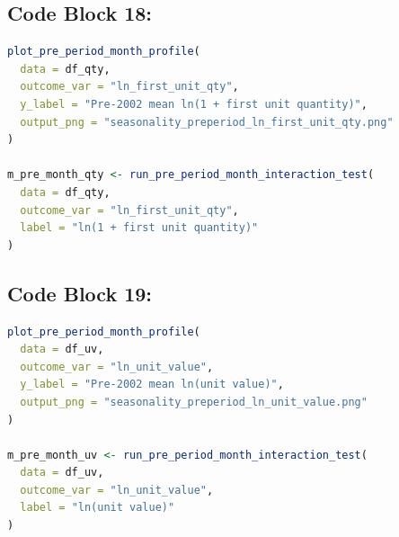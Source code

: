 \subsection*{Code Block 18: \texttt{}}
\begin{lstlisting}[language=R]
plot_pre_period_month_profile(
  data = df_qty,
  outcome_var = "ln_first_unit_qty",
  y_label = "Pre-2002 mean ln(1 + first unit quantity)",
  output_png = "seasonality_preperiod_ln_first_unit_qty.png"
)

m_pre_month_qty <- run_pre_period_month_interaction_test(
  data = df_qty,
  outcome_var = "ln_first_unit_qty",
  label = "ln(1 + first unit quantity)"
)
\end{lstlisting}

\subsection*{Code Block 19: \texttt{}}
\begin{lstlisting}[language=R]
plot_pre_period_month_profile(
  data = df_uv,
  outcome_var = "ln_unit_value",
  y_label = "Pre-2002 mean ln(unit value)",
  output_png = "seasonality_preperiod_ln_unit_value.png"
)

m_pre_month_uv <- run_pre_period_month_interaction_test(
  data = df_uv,
  outcome_var = "ln_unit_value",
  label = "ln(unit value)"
)
\end{lstlisting}

